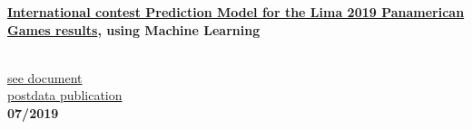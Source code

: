 \begin{minipage}{0.8\textwidth}
    \parbox{0.8\linewidth}{\textbf{\hyperref[sec:panamerican]{International contest Prediction Model for the Lima 2019 Panamerican Games results}, using Machine Learning} }\\
    \href{https://github.com/JavierOramas/PanamericanPredictor/blob/master/panamerican_predictor_paper.pdf}{see document}\\
    \href{http://www.postdata.club/issues/201907/el-medallero-de-lima-2019-que-se-puede-esperar.html}{postdata publication}\\
    \hfill \textbf{07/2019}\\
    \\
\end{minipage} \hfill {}\\
